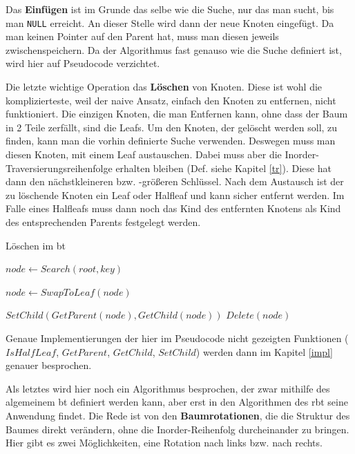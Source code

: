 \documentclass[11pt]{article}
\newcommand{\lstin}[1]{\lstinline[language=C]{#1}}
\begin{document}
Das \textbf{Einfügen} ist im Grunde das selbe wie die Suche, nur das man sucht, bis man \lstin{NULL} erreicht. 
An dieser Stelle wird dann der neue Knoten eingefügt. Da man keinen Pointer auf den Parent hat, muss man diesen jeweils zwischenspeichern.
\cite[S. 205]{aic}
Da der Algorithmus fast genauso wie die Suche definiert ist, wird hier auf Pseudocode verzichtet. 

Die letzte wichtige Operation das \textbf{Löschen} von Knoten. Diese ist wohl die komplizierteste, weil der naive Ansatz, einfach den Knoten zu entfernen, nicht funktioniert.
Die einzigen Knoten, die man Entfernen kann, ohne dass der Baum in 2 Teile zerfällt, sind die Leafs.
Um den Knoten, der gelöscht werden soll, zu finden, kann man die vorhin definierte Suche verwenden.
Deswegen muss man diesen Knoten, mit einem Leaf austauschen. Dabei muss aber die Inorder-Traversierungsreihenfolge erhalten bleiben (Def. siehe Kapitel \ref{tr}).
Diese hat dann den nächstkleineren bzw. -größeren Schlüssel.
Nach dem Austausch ist der zu löschende Knoten ein Leaf oder Halfleaf und kann sicher entfernt werden. 
Im Falle eines Halfleafs muss dann noch das Kind des entfernten Knotens als Kind des entsprechenden Parents festgelegt werden.

\begin{algorithm}
  \caption{Löschen im \gls{bt}}
  \begin{algorithmic}[1]
    \State $node \gets Search(root, key)$

      
      \Return
    \EndIf

    \State $node \gets SwapToLeaf(node)$

      \State $SetChild(GetParent(node), GetChild(node))$
    \EndIf
    \State $Delete(node)$  
    \EndProcedure
  \end{algorithmic}
\end{algorithm}
\cite[S. 210f]{aic}

Genaue Implementierungen der hier im Pseudocode nicht gezeigten Funktionen ($IsHalfLeaf$, $GetParent$, $GetChild$, $SetChild$) werden dann im Kapitel \ref{impl} genauer besprochen.

Als letztes wird hier noch ein Algorithmus besprochen, der zwar mithilfe des algemeinem \gls{bt} definiert werden kann, aber erst in den Algorithmen des \gls{rbt} seine Anwendung findet. 
Die Rede ist von den \textbf{Baumrotationen}, die die Struktur des Baumes direkt verändern, ohne die Inorder-Reihenfolg durcheinander zu bringen.
Hier gibt es zwei Möglichkeiten, eine Rotation nach links bzw. nach rechts.
\end{document}
